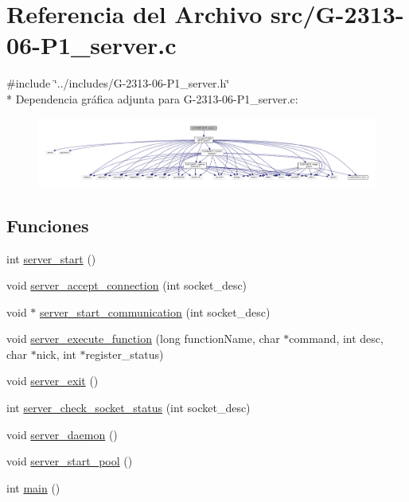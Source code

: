 \hypertarget{G-2313-06-P1__server_8c}{}\section{Referencia del Archivo src/\+G-\/2313-\/06-\/\+P1\+\_\+server.c}
\label{G-2313-06-P1__server_8c}
{\ttfamily \#include \char`\"{}../includes/\+G-\/2313-\/06-\/\+P1\+\_\+server.\+h\char`\"{}}\\*
Dependencia gráfica adjunta para G-\/2313-\/06-\/\+P1\+\_\+server.c\+:\nopagebreak
\begin{figure}[H]
\begin{center}
\leavevmode
\includegraphics[width=350pt]{G-2313-06-P1__server_8c__incl}
\end{center}
\end{figure}
\subsection*{Funciones}
\begin{DoxyCompactItemize}
\item 
int \hyperlink{G-2313-06-P1__server_8c_aa8cae03a9b52c7a550cbbdcc8aa74ede}{server\+\_\+start} ()
\item 
void \hyperlink{G-2313-06-P1__server_8c_aaac8642d2e699e0f9d942d28a9b233c2}{server\+\_\+accept\+\_\+connection} (int socket\+\_\+desc)
\item 
void $\ast$ \hyperlink{G-2313-06-P1__server_8c_a81394df6131e7cf998bd06f63f9e3995}{server\+\_\+start\+\_\+communication} (int socket\+\_\+desc)
\item 
void \hyperlink{G-2313-06-P1__server_8c_a775161328c3264fb8f96981f7a9c83ae}{server\+\_\+execute\+\_\+function} (long function\+Name, char $\ast$command, int desc, char $\ast$nick, int $\ast$register\+\_\+status)
\item 
void \hyperlink{G-2313-06-P1__server_8c_a0e947005d451a8f3bf3af01f54b59f11}{server\+\_\+exit} ()
\item 
int \hyperlink{G-2313-06-P1__server_8c_a64f1fffc5903ccf0350845cd21a95b6e}{server\+\_\+check\+\_\+socket\+\_\+status} (int socket\+\_\+desc)
\item 
void \hyperlink{G-2313-06-P1__server_8c_aa0e8000b12d9c52fc1e87847d00c9c47}{server\+\_\+daemon} ()
\item 
void \hyperlink{G-2313-06-P1__server_8c_a48d522cd984dc64ecd084f05416b1a94}{server\+\_\+start\+\_\+pool} ()
\item 
int \hyperlink{G-2313-06-P1__server_8c_ae66f6b31b5ad750f1fe042a706a4e3d4}{main} ()
\end{DoxyCompactItemize}
